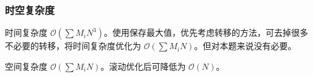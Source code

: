 			\subsubsection{时空复杂度}
				时间复杂度 $\mathcal{O}\left(\sum M_iN^3\right)$。使用保存最大值，优先考虑转移的方法，可去掉很多不必要的转移，将时间复杂度优化为 $\mathcal{O}\left(\sum M_iN\right)$。但对本题来说没有必要。
					
				空间复杂度 $\mathcal{O}\left(\sum M_i N\right)$。滚动优化后可降低为 $\mathcal{O}\left(N\right)$。
		\newpage
